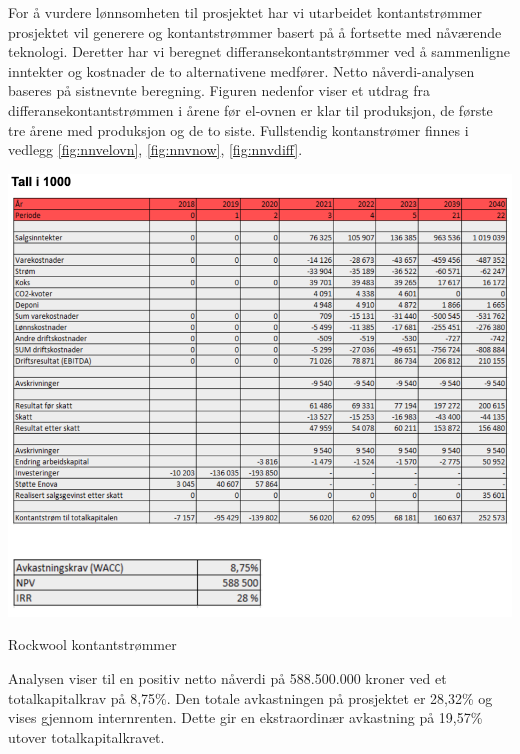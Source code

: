 For å vurdere lønnsomheten til prosjektet har vi utarbeidet kontantstrømmer prosjektet vil generere og kontantstrømmer basert på å fortsette med nåværende teknologi. Deretter har vi beregnet differansekontantstrømmer ved å sammenligne inntekter og kostnader de to alternativene medfører. Netto nåverdi-analysen baseres på sistnevnte beregning. Figuren nedenfor viser et utdrag fra differansekontantstrømmen i årene før el-ovnen er klar til produksjon, de første tre årene med produksjon og de to siste. Fullstendig kontanstrømer finnes i vedlegg \ref{fig:nnvelovn}, \ref{fig:nnvnow}, \ref{fig:nnvdiff}.

\begin{table}[H]
  \includegraphics[width=\linewidth]{tabeller/lonnsomhet.png}
  \caption{Rockwool kontantstrømmer}
  \label{tbl:lonnsomhet}
\end{table}

Analysen viser til en positiv netto nåverdi på 588.500.000 kroner ved et totalkapitalkrav på 8,75\%. Den totale avkastningen på prosjektet er 28,32\% og vises gjennom internrenten. Dette gir en ekstraordinær avkastning på 19,57\% utover totalkapitalkravet.